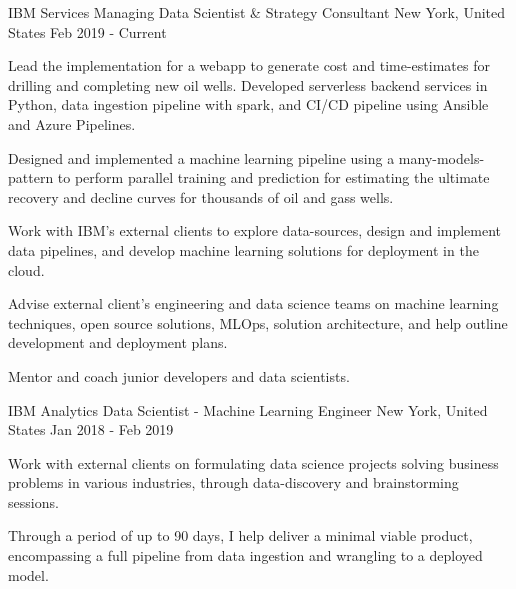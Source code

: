 

\begin{cventries}

  \cventry
    {IBM Services}
    {Managing Data Scientist \& Strategy Consultant} %
    {New York, United States} %
    {Feb 2019 - Current} %
    {
      \begin{cvitems} %
        \item {Lead the implementation for a webapp to generate cost and time-estimates for drilling and completing new oil wells. Developed serverless backend services in Python, data ingestion pipeline with spark, and CI/CD pipeline using Ansible and Azure Pipelines.}
        \item {Designed and implemented a machine learning pipeline using a many-models-pattern to perform parallel training and prediction for estimating the ultimate recovery and decline curves for thousands of oil and gass wells.}
        \item {Work with IBM's external clients to explore data-sources, design and implement data pipelines, and develop machine learning solutions for deployment in the cloud.}
        \item {Advise external client's engineering and data science teams on machine learning techniques, open source solutions, MLOps, solution architecture, and help outline development and deployment plans.}
        \item {Mentor and coach junior developers and data scientists.}
      \end{cvitems}
    }

  \cventry
    {IBM Analytics} %
    {Data Scientist - Machine Learning Engineer} %
    {New York, United States} %
    {Jan 2018 - Feb 2019} %
    {
      \begin{cvitems} %
        \item {Work with external clients on formulating data science projects solving business problems in various industries, through data-discovery and brainstorming sessions.}
        \item {Through a period of up to 90 days, I help deliver a minimal viable product, encompassing a full pipeline from data ingestion and wrangling to a deployed model.}
      \end{cvitems}
    }


\end{cventries}
